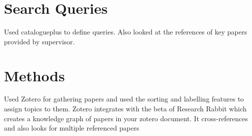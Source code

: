 \section{Search Queries}

Used catalogueplus to define queries. Also looked at the references of key papers provided by supervisor.

\section{Methods}

Used Zotero for gathering papers and used the sorting and labelling features to assign topics to them. Zotero integrates with the beta of Research Rabbit which creates a knowledge graph of papers in your zotero document. It cross-references and also looks for multiple referenced papers
